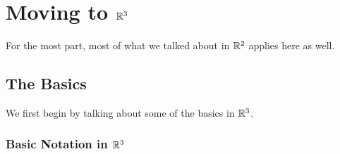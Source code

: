 \documentclass[letterpaper]{article}
\begin{document}
\section{Moving to \texorpdfstring{$\mathbb{R}^3$}{Three-Dimensions}}
For the most part, most of what we talked about in $\mathbb{R}^2$ applies here as well.

\subsection{The Basics}
We first begin by talking about some of the basics in $\mathbb{R}^3$. 

\subsubsection{Basic Notation in \texorpdfstring{$\mathbb{R}^3$}{Three-Dimensions}}
\end{document}
